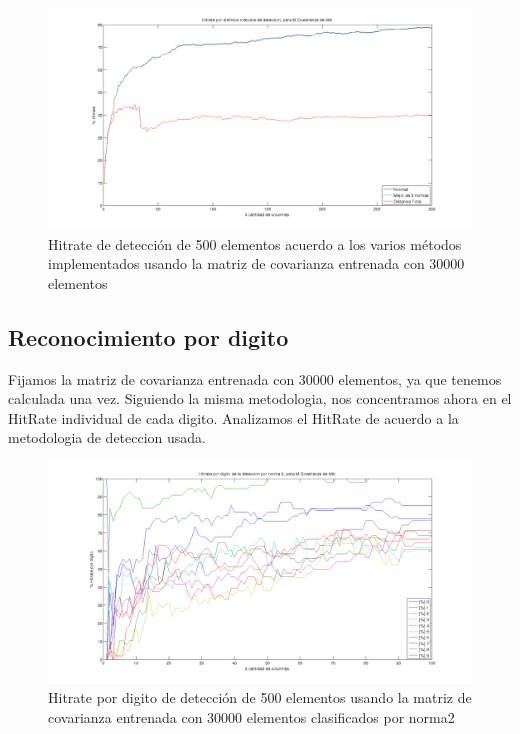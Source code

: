 \begin{figure}[H]
\begin {center}
\includegraphics[width=500pt]{plots/hitrate-30kcv.png}
\end {center}
\caption{Hitrate de detecci\'on de 500 elementos acuerdo a los varios m\'etodos implementados
usando la matriz de covarianza entrenada con 30000 elementos}
\label{fig:HR30kcv}
\end{figure}



\subsection{Reconocimiento por digito}
Fijamos la matriz de covarianza entrenada con 30000 elementos, ya que tenemos calculada una vez.
Siguiendo la misma metodologia, nos concentramos ahora en el HitRate individual
de cada digito. Analizamos el HitRate de acuerdo a la metodologia de deteccion usada.


\begin{figure}[H]
\begin {center}
\includegraphics[width=500pt]{plots/pordig-30kcv-norma2.png}
\end {center}
\caption{Hitrate por digito de detecci\'on de 500 elementos usando la matriz de covarianza entrenada con 30000 elementos
clasificados por norma2}
\label{fig:HRD30kcv-n2}
\end{figure}


